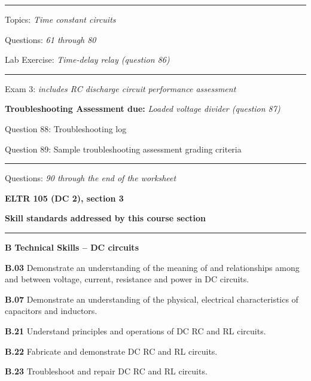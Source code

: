 \vskip 10pt
\hrule \vskip 5pt
\noindent
{}

\hskip 10pt Topics: {\it Time constant circuits}
 
\hskip 10pt Questions: {\it 61 through 80}
 
\hskip 10pt Lab Exercise: {\it Time-delay relay (question 86)}
 
\vskip 10pt
\hrule \vskip 5pt
\noindent
{}

\hskip 10pt Exam 3: {\it includes RC discharge circuit performance assessment}
 
\hskip 10pt {\bf Troubleshooting Assessment due:} {\it Loaded voltage divider (question 87)}
 
\hskip 10pt Question 88: Troubleshooting log
 
\hskip 10pt Question 89: Sample troubleshooting assessment grading criteria
 
\vskip 10pt
\hrule \vskip 5pt
\noindent
{}

\hskip 10pt Questions: {\it 90 through the end of the worksheet}
 
\vskip 10pt







\vfil \eject

\centerline{\bf ELTR 105 (DC 2), section 3} \bigskip 
 
\vskip 10pt

\noindent
{\bf Skill standards addressed by this course section}

\vskip 5pt

\hrule \vskip 10pt
\noindent
{}

\vskip 5pt

\medskip
\item{\bf B} {\bf Technical Skills -- DC circuits}
\item{\bf B.03} Demonstrate an understanding of the meaning of and relationships among and between voltage, current, resistance and power in DC circuits.
\item{\bf B.07} Demonstrate an understanding of the physical, electrical characteristics of capacitors and inductors.
\item{\bf B.21} Understand principles and operations of DC RC and RL circuits.
\item{\bf B.22} Fabricate and demonstrate DC RC and RL circuits.
\item{\bf B.23} Troubleshoot and repair DC RC and RL circuits.
\medskip

